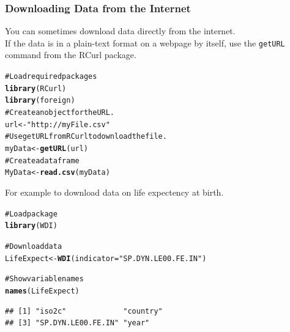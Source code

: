 \documentclass{beamer}\usepackage{graphicx, color}
\makeatletter
\newcommand{\hlfunctioncall}[1]{\textcolor[rgb]{0.501960784313725,0,0.329411764705882}{\textbf{#1}}}%
\newcommand{\hlstring}[1]{\textcolor[rgb]{0.6,0.6,1}{#1}}%
\newcommand{\hlcomment}[1]{\textcolor[rgb]{0.180392156862745,0.6,0.341176470588235}{#1}}%
\newenvironment{kframe}{%
 \def\at@end@of@kframe{}%
 \ifinner\ifhmode%
  \def\at@end@of@kframe{\end{minipage}}%
  \begin{minipage}{\columnwidth}%
 \fi\fi%
 \def\FrameCommand##1{\hskip\@totalleftmargin \hskip-\fboxsep
 \colorbox{shadecolor}{##1}\hskip-\fboxsep
     \hskip-\linewidth \hskip-\@totalleftmargin \hskip\columnwidth}%
 \MakeFramed {\advance\hsize-\width
   \@totalleftmargin\z@ \linewidth\hsize
   \@setminipage}}%
 {\par\unskip\endMakeFramed%
 \at@end@of@kframe}
\newenvironment{knitrout}{}{} %
\makeatother
\begin{document}
\begin{frame}[fragile]
  \frametitle{Downloading Data from the Internet}
  You can sometimes download data directly from the internet. \\[0.5cm]
  If the data is in a plain-text format on a webpage by itself, use the \texttt{getURL} command from the RCurl package.
  
\begin{knitrout}
\color{fgcolor}\begin{kframe}
\begin{alltt}
\hlcomment{# Load required packages}
\hlfunctioncall{library}(RCurl)
\hlfunctioncall{library}(foreign)
\hlcomment{# Create an object for the URL.}
url <- \hlstring{"http://myFile.csv"}
\hlcomment{# Use getURL from RCurl to download the file.}
myData <- \hlfunctioncall{getURL}(url)
\hlcomment{# Create a data frame}
MyData <- \hlfunctioncall{read.csv}(myData)
\end{alltt}
\end{kframe}
\end{knitrout}

\end{frame}



\begin{frame}[fragile]
  For example to download data on life expectency at birth.
\begin{knitrout}
\color{fgcolor}\begin{kframe}
\begin{alltt}
\hlcomment{# Load package}
\hlfunctioncall{library}(WDI)

\hlcomment{# Download data}
LifeExpect <- \hlfunctioncall{WDI}(indicator = \hlstring{"SP.DYN.LE00.FE.IN"})

\hlcomment{# Show variable names}
\hlfunctioncall{names}(LifeExpect)
\end{alltt}
\begin{verbatim}
## [1] "iso2c"             "country"          
## [3] "SP.DYN.LE00.FE.IN" "year"
\end{verbatim}
\end{kframe}
\end{knitrout}

\end{frame}
\end{document}
